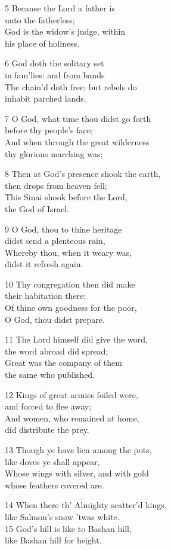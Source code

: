 5 Because the Lord a father is\\
unto the fatherless;\\
God is the widow’s judge, within\\
his place of holiness.

6 God doth the solitary set\\
in fam’lies: and from bands\\
The chain’d doth free; but rebels do\\
inhabit parched lands.

7 O God, what time thou didst go forth\\
before thy people’s face;\\
And when through the great wilderness\\
thy glorious marching was;

8 Then at God’s presence shook the earth,\\
then drops from heaven fell;\\
This Sinai shook before the Lord,\\
the God of Israel.

9 O God, thou to thine heritage\\
didst send a plenteous rain,\\
Whereby thou, when it weary was,\\
didst it refresh again.

10 Thy congregation then did make\\
their habitation there:\\
Of thine own goodness for the poor,\\
O God, thou didst prepare.

11 The Lord himself did give the word,\\
the word abroad did spread;\\
Great was the company of them\\
the same who published.

12 Kings of great armies foiled were,\\
and forced to flee away;\\
And women, who remained at home,\\
did distribute the prey.

13 Though ye have lien among the pots,\\
like doves ye shall appear,\\
Whose wings with silver, and with gold\\
whose feathers covered are.

14 When there th’ Almighty scatter’d kings,\\
like Salmon’s snow ’twas white.\\
15 God’s hill is like to Bashan hill,\\
like Bashan hill for height.

